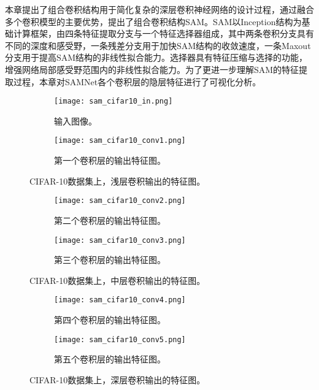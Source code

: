 本章提出了组合卷积结构用于简化复杂的深层卷积神经网络的设计过程，通过融合多个卷积模型的主要优势，提出了组合卷积结构SAM。SAM以Inception结构为基础计算框架，由四条特征提取分支与一个特征选择器组成，其中两条卷积分支具有不同的深度和感受野，一条残差分支用于加快SAM结构的收敛速度，一条Maxout分支用于提高SAM结构的非线性拟合能力。选择器具有特征压缩与选择的功能，增强网络局部感受野范围内的非线性拟合能力。为了更进一步理解SAM的特征提取过程，本章对SAMNet各个卷积层的隐层特征进行了可视化分析。


\begin{figure}[h]
  \centering%
  \begin{subfigure}{0.13\textwidth}
    \texttt{[image: sam\_cifar10\_in.png]}
    \caption{输入图像。}
  \end{subfigure}%
  \hspace{1em}%
  \begin{subfigure}{0.8\textwidth}
    \texttt{[image: sam\_cifar10\_conv1.png]}
    \caption{第一个卷积层的输出特征图。}
  \end{subfigure}
  \caption{CIFAR-10数据集上，浅层卷积输出的特征图。}
  \label{fig:sam_cifar10_conv1}
\end{figure}


\begin{figure}[h]
  \centering%
  \begin{subfigure}{0.45\textwidth}
    \texttt{[image: sam\_cifar10\_conv2.png]}
    \caption{第二个卷积层的输出特征图。}
  \end{subfigure}%
  \hspace{1em}%
  \begin{subfigure}{0.45\textwidth}
    \texttt{[image: sam\_cifar10\_conv3.png]}
    \caption{第三个卷积层的输出特征图。}
  \end{subfigure}
  \caption{CIFAR-10数据集上，中层卷积输出的特征图。}
  \label{fig:sam_cifar10_conv3}
\end{figure}

\begin{figure}[h]
  \centering%
  \begin{subfigure}{0.45\textwidth}
    \texttt{[image: sam\_cifar10\_conv4.png]}
    \caption{第四个卷积层的输出特征图。}
  \end{subfigure}%
  \hspace{1em}%
  \begin{subfigure}{0.45\textwidth}
    \texttt{[image: sam\_cifar10\_conv5.png]}
    \caption{第五个卷积层的输出特征图。}
  \end{subfigure}
  \caption{CIFAR-10数据集上，深层卷积输出的特征图。}
  \label{fig:sam_cifar10_conv5}
\end{figure}

